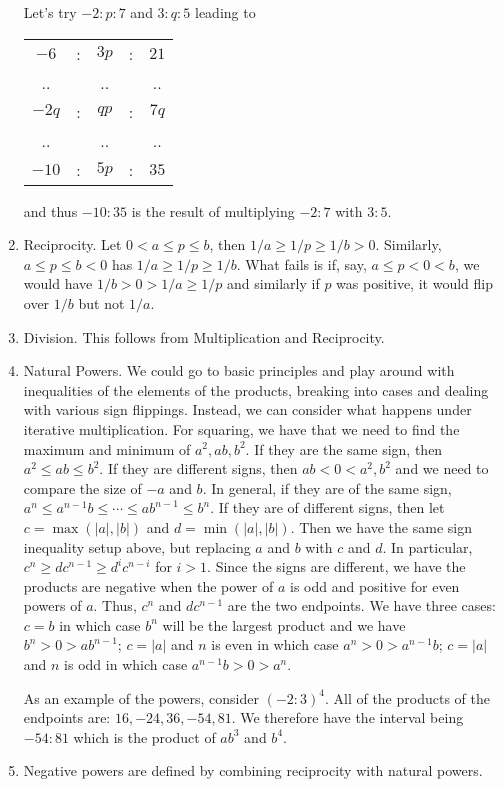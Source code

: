 \documentclass[12pt]{article}
\theoremstyle{remark}
\begin{document}
\begin{enumerate}
    Let's try $-2 : p : 7$ and $3: q : 5$ leading to
    
     \begin{tabular}{ccccc}
        $-6$ &:& $3p$ &:& $21$ \\
        .. & & .. & & .. \\
        $-2q$ &:& $qp$ &:& $7q$\\
        .. & & .. & & .. \\
         $-10$ &:& $5p$&:& $35$
    \end{tabular}
    
    and thus $-10:35$ is the result of multiplying $-2:7$ with $3:5$.

    
    
    \item Reciprocity. Let $0 < a \leq p \leq b$, then $1/a \geq 1/p  \geq 1/b > 0$. Similarly, $a \leq p \leq b< 0$ has $1/a \geq 1/p \geq 1/b$. What fails is if, say,  $a \leq p < 0 < b$, we would have $1/b > 0 > 1/a \geq 1/p $ and similarly if $p$ was positive, it would flip over $1/b$ but not $1/a$.
    \item Division. This follows from Multiplication and Reciprocity. 
    \item Natural Powers. We could go to basic principles and play around with inequalities of the elements of the products, breaking into cases and dealing with various sign flippings. Instead, we can consider what happens under iterative multiplication. For squaring, we have that we need to find the maximum and minimum of $a^2, ab, b^2$. If they are the same sign, then $a^2 \leq ab \leq b^2$. If they are different signs, then $ab < 0 < a^2, b^2$ and we need to compare the size of $-a$ and $b$.  In general, if they are of the same sign, $a^n \leq a^{n-1} b \leq \cdots \leq ab^{n-1} \leq b^n$. If they are of different signs, then let $c = \max( |a|, |b|)$ and $d=\min(|a|, |b|)$. Then we have the same sign inequality setup above, but replacing $a$ and $b$ with $c$ and $d$. In particular,  $c^n \geq d c^{n-1} \geq d^{i}c^{n-i}$  for $i > 1$.  Since the signs are different, we have the products are negative when the power of $a$ is odd and positive for even powers of $a$. Thus, $c^n$ and $d c^{n-1}$ are the two endpoints. We have three cases: $c=b$ in which case $b^n$ will be the largest product and we have $b^n > 0 > ab^{n-1}$; $c=|a|$ and $n$ is even in which case $a^n > 0 > a^{n-1} b$; $c=|a|$ and $n$ is odd in which case $a^{n-1} b > 0 > a^n$.  

As an example of the powers, consider $(-2:3)^4$. All of the products of the endpoints are: $16, -24, 36, -54, 81$. We therefore have the interval being $-54:81$ which is the product of $ab^3$ and $b^4$. 

    
     
    \item Negative powers are defined by combining reciprocity with natural powers. 
\end{enumerate}
\end{document}
